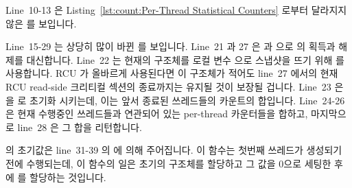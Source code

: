 Line~10-13 은
Listing~\ref{lst:count:Per-Thread Statistical Counters}
로부터 달라지지 않은  를 보입니다.
\iffalse

Lines~1-4 of
Listing~\ref{lst:together:RCU and Per-Thread Statistical Counters}
show the \co{countarray} structure, which contains a
\co{->total} field for the count from previously exited threads,
and a \co{counterp[]} array of pointers to the per-thread
\co{counter} for each currently running thread.
This structure allows a given execution of \co{read_count()}
to see a total that is consistent with the indicated set of running
threads.

Lines~6-8 contain the definition of the per-thread \co{counter}
variable, the global pointer \co{countarrayp} referencing
the current \co{countarray} structure, and
the \co{final_mutex} spinlock.

Lines~10-13 show \co{inc_count()}, which is unchanged from
Listing~\ref{lst:count:Per-Thread Statistical Counters}.
\fi

Line~15-29 는 상당히 많이 바뀐  를 보입니다.
Line~21 과 27 은  과  으로
 의 획득과 해제를 대신합니다.
Line~22 는 현재의  구조체를 로컬 변수  으로 스냅샷을
뜨기 위해  를 사용합니다.
RCU 가 올바르게 사용된다면 이  구조체가 적어도 line~27 에서의
현재 RCU read-side 크리티컬 섹션의 종료까지는 유지될 것이 보장될 겁니다.
Line~23 은  을  로 초기화 시키는데, 이는 앞서 종료된
쓰레드들의 카운트의 합입니다.
Line~24-26 은 현재 수행중인 쓰레드들과 연관되어 있는 per-thread 카운터들을
합하고, 마지막으로 line~28 은 그 합을 리턴합니다.
\iffalse

Lines~15-29 show \co{read_count()}, which has changed significantly.
Lines~21 and~27 substitute \co{rcu_read_lock()} and
\co{rcu_read_unlock()} for acquisition and release of \co{final_mutex}.
Line~22 uses \co{rcu_dereference()} to snapshot the
current \co{countarray} structure into local variable \co{cap}.
Proper use of RCU will guarantee that this \co{countarray} structure
will remain with us through at least the end of the current RCU
read-side critical section at line~27.
Line~23 initializes \co{sum} to \co{cap->total}, which is the
sum of the counts of threads that have previously exited.
Lines~24-26 add up the per-thread counters corresponding to currently
running threads, and, finally, line~28 returns the sum.
\fi

 의 초기값은 line~31-39 의  에 의해
주어집니다.
이 함수는 첫번째 쓰레드가 생성되기 전에 수행되는데, 이 함수의 일은 초기의
구조체를 할당하고 그 값을 0으로 세팅한 후에  를 할당하는
것입니다.

